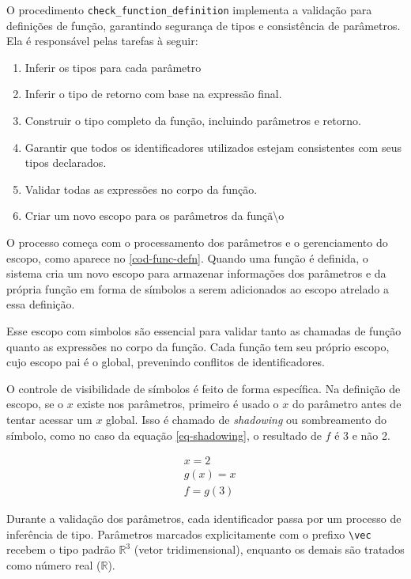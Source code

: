 O procedimento \verb"check_function_definition" implementa a validação para definições de função, garantindo segurança de tipos e consistência de parâmetros. Ela é responsável pelas tarefas à seguir:

\begin{enumerate}
    \item Inferir os tipos para cada parâmetro
    \item Inferir o tipo de retorno com base na expressão final.
    \item Construir o tipo completo da função, incluindo parâmetros e retorno.
    \item Garantir que todos os identificadores utilizados estejam consistentes com seus tipos declarados.
    \item Validar todas as expressões no corpo da função.
    \item Criar um novo escopo para os parâmetros da funçã\textbackslash{}o
\end{enumerate}

O processo começa com o processamento dos parâmetros e o gerenciamento do escopo, como aparece no \autoref{cod-func-defn}. Quando uma função é definida, o sistema cria um novo escopo para armazenar informações dos parâmetros e da própria função em forma de símbolos a serem adicionados ao escopo atrelado a essa definição.

Esse escopo com simbolos são essencial para validar tanto as chamadas de função quanto as expressões no corpo da função. Cada função tem seu próprio escopo, cujo escopo pai é o global, prevenindo conflitos de identificadores.

O controle de visibilidade de símbolos é feito de forma específica. Na definição de escopo, se o $x$ existe nos parâmetros, primeiro é usado o $x$ do parâmetro antes de tentar acessar um $x$ global. Isso é chamado de \textit{shadowing} ou sombreamento do símbolo, como no caso da equação \autoref{eq-shadowing}, o resultado de $f$ é 3 e não 2.

\begin{align} \label{eq-shadowing}
    &x = 2 \\
    &g(x) = x \\
    &f = g(3)
\end{align}


Durante a validação dos parâmetros, cada identificador passa por um processo de inferência de tipo. Parâmetros marcados explicitamente com o prefixo \verb"\vec" recebem o tipo padrão $\mathbb{R}^3$ (vetor tridimensional), enquanto os demais são tratados como número real ($\mathbb{R}$).

